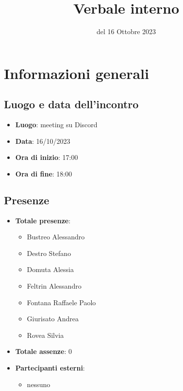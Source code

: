 \documentclass[12pt]{article}
\title{Verbale interno}
\date{del 16 Ottobre 2023}
\begin{document}
	\makefirstpage
	
	
	\clearpage
	
	\tableofcontents
	\clearpage
	
	\section{Informazioni generali}
		\subsection{Luogo e data dell'incontro}
		
		\begin{itemize}
			\item \textbf{Luogo}: meeting su Discord
			\item \textbf{Data}: 16/10/2023
			\item \textbf{Ora di inizio}: 17:00
			\item \textbf{Ora di fine}: 18:00
		\end{itemize}
	
		\subsection{Presenze}
		
		\begin{itemize}
			\item \textbf{Totale presenze}:
			\begin{itemize}
				\item Bustreo Alessandro
				\item Destro Stefano
				\item Domuta Alessia 
				\item Feltrin Alessandro 
				\item Fontana Raffaele Paolo 
				\item Giurisato Andrea 
				\item Rovea Silvia
			\end{itemize}
			
			\item \textbf{Totale assenze}: 0
			
			\item \textbf{Partecipanti esterni}:
			\begin{itemize}
				\item nessuno
			\end{itemize}
		\end{itemize}
		
\end{document}
